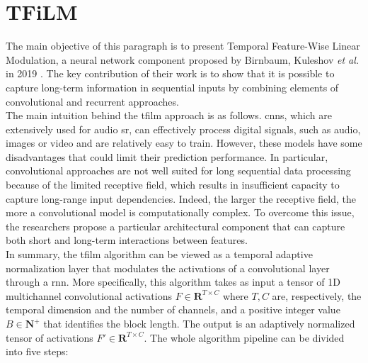 \section{TFiLM} \label{tfilm}
The main objective of this paragraph is to present Temporal Feature-Wise Linear Modulation, a neural network component proposed by Birnbaum, Kuleshov \textit{et al.} in 2019 \cite{birnbaum2019temporal}. The key contribution of their work is to show that it is possible to capture long-term information in sequential inputs by combining elements of convolutional and recurrent approaches. \\
The main intuition behind the \gls{tfilm} approach is as follows. \gls{cnn}s, which are extensively used for audio \gls{sr}, can effectively process digital signals, such as audio, images or video and are relatively easy to train. However, these models have some disadvantages that could limit their prediction performance. In particular, convolutional approaches are not well suited for long sequential data processing because of the limited receptive field, which results in insufficient capacity to capture long-range input dependencies. Indeed, the larger the receptive field, the more a convolutional model is computationally complex. To overcome this issue, the researchers propose a particular architectural component that can capture both short and long-term interactions between features.\\
In summary, the \gls{tfilm} algorithm can be viewed as a temporal adaptive normalization layer that modulates the activations of a convolutional layer through a \gls{rnn}. More specifically, this algorithm takes as input a tensor of 1D multichannel convolutional activations $F \in \mathbf{R}^{T \times C}$ where $T, C$ are, respectively, the temporal dimension and the number of channels, and a positive integer value $B \in \mathbf{N}^{+}$ that identifies the block length. The output is an adaptively normalized tensor of activations $F' \in \mathbf{R}^{T \times C}$. The whole algorithm pipeline can be divided into five steps:
